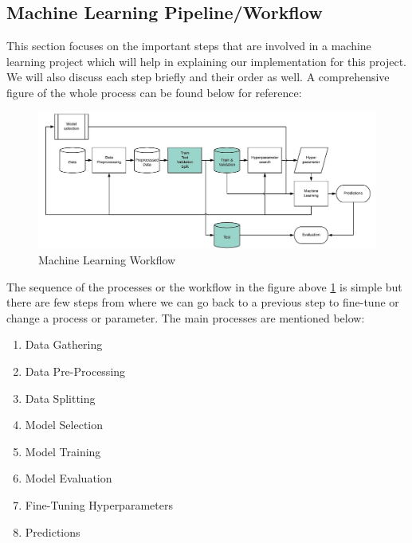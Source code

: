 \subsection{Machine Learning Pipeline/Workflow}
This section focuses on the important steps that are involved in a machine learning project which will help in explaining our implementation for this project. We will also discuss each step briefly and their order as well. A comprehensive figure of the whole process can be found below for reference:

\begin{figure}[H]
\centering
\includegraphics[scale=0.3]{images/Chapter2/ml-pipeline.jpg}
\caption{Machine Learning Workflow \cite{ml-pipeline}}
\label{ml-pipeline}
\end{figure}
\par
The sequence of the processes or the workflow in the figure above \ref{ml-pipeline} is simple but there are few steps from where we can go back to a previous step to fine-tune or change a process or parameter. The main processes are mentioned below:
\newline
\begin{enumerate}
  \item Data Gathering
  \item  Data Pre-Processing
  \item  Data Splitting
  \item  Model Selection
  \item  Model Training
  \item  Model Evaluation
  \item  Fine-Tuning Hyperparameters
  \item  Predictions
\end{enumerate}
